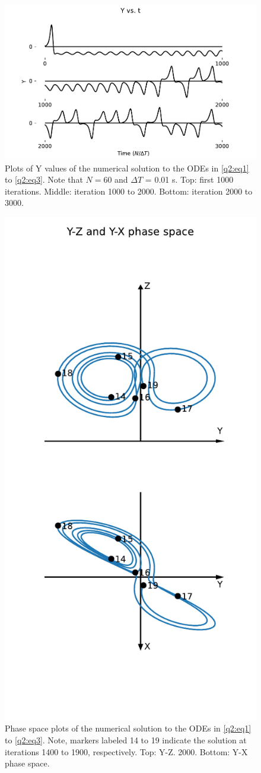 \documentclass[a4paper,11pt]{article}
\theoremstyle{plain}
\theoremstyle{definition}
\theoremstyle{remark}
\begin{document}
\begin{figure}[H]
    \centering
    \includegraphics[width=\linewidth]{../plots/a3q2_y_vs_t.pdf}
    \caption{Plots of Y values of the
    numerical solution to the ODEs in \cref{q2:eq1} to \cref{q2:eq3}.
    Note that $N = 60$ and $\Delta T$ = 0.01 s. Top: first 1000 iterations.
    Middle: iteration 1000 to
    2000. Bottom: iteration 2000 to 3000.}
    \label{q2:1}
\end{figure}

\begin{figure}[H]
    \centering
    \includegraphics[width=0.6\linewidth]{../plots/a3q2_phase.pdf}
    \caption{Phase space plots of the
    numerical solution to the ODEs in \cref{q2:eq1} to \cref{q2:eq3}.
    Note, markers labeled
    14 to 19 indicate the solution at
    iterations 1400 to 1900, respectively. Top: Y-Z.
    2000. Bottom: Y-X phase space.}
    \label{q2:2}
\end{figure}
\end{document}
